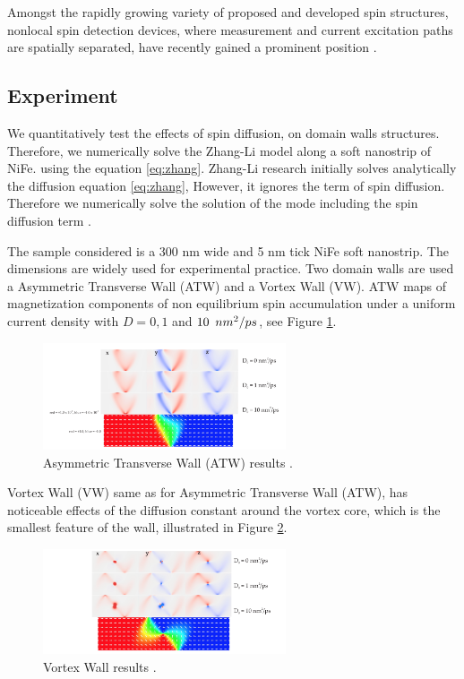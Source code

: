 Amongst the rapidly growing variety of proposed and developed spin structures, nonlocal spin detection devices, where measurement and current excitation paths are spatially separated, have recently gained a prominent position \cite{spinz}.

\subsection{Experiment}

We quantitatively test the effects of spin diffusion, on domain walls structures. Therefore, we numerically solve the Zhang-Li model along a soft nanostrip of NiFe. using the equation \ref{eq:zhang}. Zhang-Li research initially solves analytically the diffusion equation \ref{eq:zhang}, However, it ignores the term of spin diffusion. Therefore we numerically solve the solution of the mode including the spin diffusion term \cite{zhang}.

The sample considered is a 300 nm wide and 5 nm tick NiFe soft nanostrip. The dimensions are widely used for experimental practice. Two domain walls are used a Asymmetric Transverse Wall (ATW) and a Vortex Wall (VW). ATW maps of magnetization components of non equilibrium spin accumulation under a uniform current density with $D = 0, 1$ and $10 \enskip nm^2 / ps$, see Figure \ref{fig:atw}.

\begin{figure}[htbp]
	\centering
		\includegraphics[width=0.64\textwidth]{Figures/ATW.png}
		\smallskip
	\caption[Asymmetric Transverse Wall results]{Asymmetric Transverse Wall (ATW) results \cite{claudio}.}
	\label{fig:atw}
\end{figure}

Vortex Wall (VW) same as for Asymmetric Transverse Wall (ATW), has noticeable effects of the diffusion constant around the vortex core, which is the smallest feature of the wall, illustrated in Figure \ref{fig:vw}.

\begin{figure}[htbp]
	\centering
		\includegraphics[width=0.64\textwidth]{Figures/VW.png}
		\smallskip
	\caption[Vortex Wall results]{Vortex Wall results \cite{claudio}. }
	\label{fig:vw}
\end{figure}

